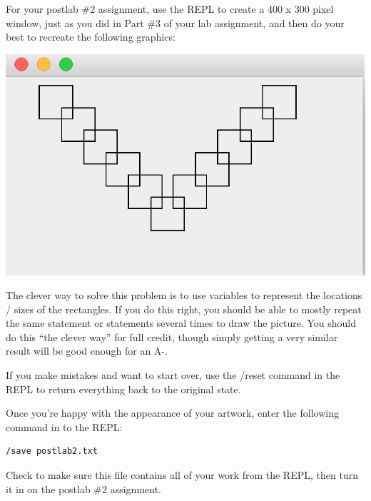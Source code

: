 For your postlab \#2 assignment, use the REPL to create a 400 x 300 pixel window, just as you did in Part \#3 of your lab assignment, and then do your best to recreate the following graphics:

\includegraphics[scale=1]{lab2/lab2ss.eps} 

The clever way to solve this problem is to use variables to represent the locations / sizes of the rectangles. If you do this right, you should be able to mostly repeat the same statement or statements several times to draw the picture. You should do this ``the clever way'' for full credit, though simply getting a very similar result will be good enough for an A-. 

If you make mistakes and want to start over, use the /reset command in the REPL to return everything back to the original state. 

Once you're happy with the appearance of your artwork, enter the following command in to the REPL:

\begin{verbatim}
/save postlab2.txt
\end{verbatim}

Check to make sure this file contains all of your work from the REPL, then 
turn it in on the postlab \#2 assignment. 
